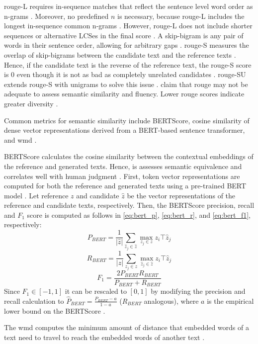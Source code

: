 \ac{rouge}-L requires in-sequence matches that reflect the sentence level word order as n-grams \citep{lin_rouge_2004}.
Moreover, no predefined $n$ is necessary, because \ac{rouge}-L includes the longest in-sequence common n-grams \citep{lin_rouge_2004}.
However, \ac{rouge}-L does not include shorter sequences or alternative LCSes in the final score \citep{lin_rouge_2004}.
A skip-bigram is any pair of words in their sentence order, allowing for arbitrary gaps \citep{lin_rouge_2004}.
\ac{rouge}-S measures the overlap of skip-bigrams between the candidate text and the reference texts \citep{lin_rouge_2004}.
Hence, if the candidate text is the reverse of the reference text, the \ac{rouge}-S score is 0 even though it is not as bad as completely unrelated candidates \citep{lin_rouge_2004}.
\ac{rouge}-SU extends \ac{rouge}-S with unigrams to solve this issue \citep{lin_rouge_2004}.
\citet{kurt_pehlivanoglu_comparative_2024} claim that \ac{rouge} may not be adequate to assess semantic similarity and fluency.
Lower \ac{rouge} scores indicate greater diversity \citep{kurt_pehlivanoglu_comparative_2024}.

Common metrics for semantic similarity include BERTScore, 
cosine similarity of dense vector representations derived from a BERT-based sentence transformer, 
and \ac{wmd} \citep{gohsen_captions_2023}.

BERTScore calculates the cosine similarity between the contextual embeddings of the reference and generated texts. 
Hence, is assesses semantic equivalence and correlates well with human judgment \citep{kurt_pehlivanoglu_comparative_2024}.
First, token vector representations are computed for both the reference and generated texts using a pre-trained BERT model \citep{hanna_fine_grained_2021}.
Let reference $z$ and candidate $\hat{z}$ be the vector representations of the reference and candidate texts, respectively.
Then, the BERTScore precision, recall and $F_1$ score is computed as follows in \autoref{eq:bert_p}, \autoref{eq:bert_r}, and \autoref{eq:bert_f1}, respectively:
\begin{equation}
    P_{BERT} = \frac{1}{|\hat{z}|} \sum_{\hat{z}_j \in \hat{z}} \max_{z_j \in z} z_i\top \hat{z}_j
\label{eq:bert_p}
\end{equation}
\begin{equation}
    R_{BERT} = \frac{1}{|z|} \sum_{z_j \in z} \max_{\hat{z}_j \in \hat{z}} z_i\top \hat{z}_j
\label{eq:bert_r}
\end{equation}
\begin{equation}
    F_1 = \frac{2 P_{BERT} R_{BERT}}{P_{BERT} + R_{BERT}} 
\label{eq:bert_f1}
\end{equation}
Since $F_1 \in \left[-1,1\right]$ it can be rescaled to $[0,1]$ by modifying the precision and recall calculation 
to $\hat{P}_{BERT} = \frac{P_{BERT} - a}{1 - a}$ ($R_{BERT}$ analogous), where $a$ is the empirical lower bound on the BERTScore \citep{hanna_fine_grained_2021}.

The \ac{wmd} computes the minimum amount of distance that embedded words of a text need to travel 
to reach the embedded words of another text \citep{gohsen_captions_2023}.

